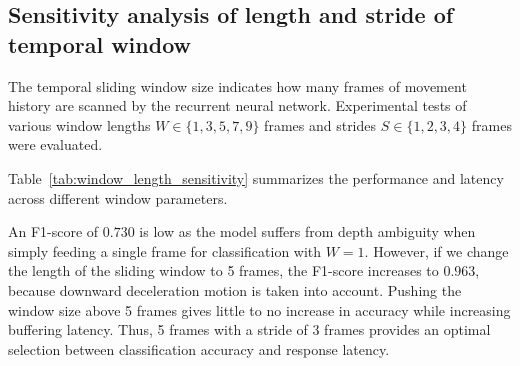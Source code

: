 \subsection{Sensitivity analysis of length and stride of temporal window}
\label{subsec:test_window_sensitivity}
The temporal sliding window size indicates how many frames of movement history are scanned by the recurrent neural network. Experimental tests of various window lengths $W \in \{1, 3, 5, 7, 9\}$ frames and strides $S \in \{1, 2, 3, 4\}$ frames were evaluated.

Table~\ref{tab:window_length_sensitivity} summarizes the performance and latency across different window parameters.

\begin{table}[htbp]
\centering
\caption{Sensitivity analysis of temporal window length and stride.}
\label{tab:window_length_sensitivity}
\end{table}

An F1-score of $0.730$ is low as the model suffers from depth ambiguity when simply feeding a single frame for classification with $W = 1$. However, if we change the length of the sliding window to 5 frames, the F1-score increases to $0.963$, because downward deceleration motion is taken into account. Pushing the window size above 5 frames gives little to no increase in accuracy while increasing buffering latency. Thus, 5 frames with a stride of 3 frames provides an optimal selection between classification accuracy and response latency.

